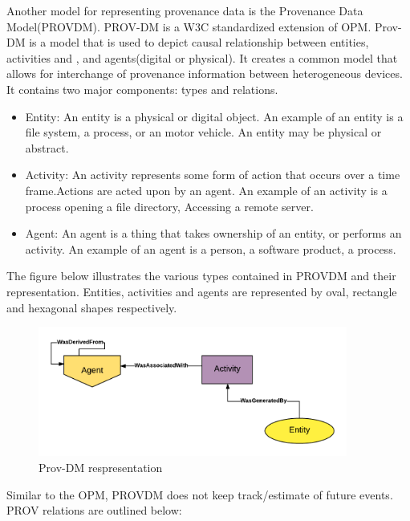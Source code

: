 Another model for representing provenance data is the Provenance Data Model(PROV\-DM). PROV-DM is a W3C standardized extension of OPM. Prov-DM is a model that is used to depict causal relationship between entities, activities and , and agents(digital or physical).  It creates a common model that allows for interchange of provenance information between heterogeneous devices. It contains two major components: types and relations. 


\begin{itemize}

\item Entity: An entity is a physical or digital object. An example of an entity is a file system, a process, or an motor vehicle. An entity may be physical or abstract.

\item Activity: An activity represents some form of action that occurs over a time frame.Actions are acted upon by an agent. An example of an activity is a process opening a file directory, Accessing a remote server.

\item Agent: An agent is a thing that takes ownership of an entity, or performs an activity. An example of an agent is a person, a software product, a process.
\end{itemize}

The figure below illustrates the various types contained in PROV\-DM and their representation. Entities, activities and agents are represented by oval, rectangle and hexagonal shapes respectively.

\begin{figure}[h]
\begin{center}

\includegraphics[width=4.0in]{prov_dm_1.PNG}
\end{center}
\caption{Prov-DM respresentation }
\end{figure}

Similar to the OPM, PROV\-DM does not keep track/estimate of future events. PROV relations are outlined below:


